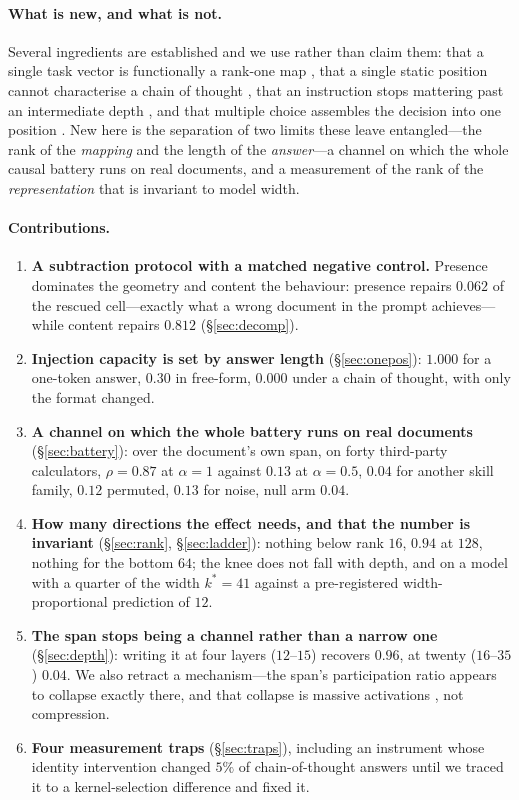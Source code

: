 \documentclass{article}
\begin{document}
\paragraph{What is new, and what is not.} Several ingredients are established
and we use rather than claim them: that a single task vector is functionally a
rank-one map \citep{dong2026taskvectorlimits}, that a single static position
cannot characterise a chain of thought \citep{dura2026sequentialpatching}, that
an instruction stops mattering past an intermediate depth
\citep{onset2025instruction}, and that multiple choice assembles the decision
into one position \citep{wiegreffe2025mcq}. New here is the separation of two
limits these leave entangled---the rank of the \emph{mapping} and the length of
the \emph{answer}---a channel on which the whole causal battery runs on real
documents, and a measurement of the rank of the \emph{representation} that is
invariant to model width.

\paragraph{Contributions.}
\begin{enumerate}\itemsep0pt\parskip0pt
\item \textbf{A subtraction protocol with a matched negative control.} Presence
dominates the geometry and content the behaviour: presence repairs $0.062$ of
the rescued cell---exactly what a wrong document in the prompt achieves---while
content repairs $0.812$ (\S\ref{sec:decomp}).
\item \textbf{Injection capacity is set by answer length} (\S\ref{sec:onepos}):
$1.000$ for a one-token answer, $0.30$ in free-form, $0.000$ under a chain of
thought, with only the format changed.
\item \textbf{A channel on which the whole battery runs on real documents}
(\S\ref{sec:battery}): over the document's own span, on forty third-party
calculators, $\rho = 0.87$ at $\alpha=1$ against $0.13$ at $\alpha=0.5$, $0.04$
for another skill family, $0.12$ permuted, $0.13$ for noise, null arm $0.04$.
\item \textbf{How many directions the effect needs, and that the number is
invariant} (\S\ref{sec:rank}, \S\ref{sec:ladder}): nothing below rank $16$,
$0.94$ at $128$, nothing for the bottom $64$; the knee does not fall with depth,
and on a model with a quarter of the width $k^{*}=41$ against a pre-registered
width-proportional prediction of $12$.
\item \textbf{The span stops being a channel rather than a narrow one}
(\S\ref{sec:depth}): writing it at four layers ($12$--$15$) recovers $0.96$, at
twenty ($16$--$35$) $0.04$. We also retract a mechanism---the span's
participation ratio appears to collapse exactly there, and that collapse is
massive activations \citep{sun2024massive}, not compression.
\item \textbf{Four measurement traps} (\S\ref{sec:traps}), including an
instrument whose identity intervention changed $5\%$ of chain-of-thought answers
until we traced it to a kernel-selection difference and fixed it.
\end{enumerate}
\end{document}

